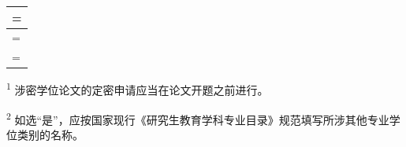 \documentclass[UTF8,fontset=fandol,zihao=5]{ctexart}
\newcommand{\ThesisTitle}{}
\newcommand{\TopicScope}{}
\newcommand{\ClassificationNumber}{}
\newcommand{\ProposalMeetingDate}{\hspace{1em}年\hspace{1em}月\hspace{1em}日}
\newcommand{\CrossDisciplineName}{}
\newcommand{\DomesticReferenceCount}{}
\newcommand{\ForeignReferenceCount}{}
\newcommand{\PublicMark}{}
\newcommand{\SecretMark}{}
\newcommand{\ConfidentialMark}{}
\newcommand{\CrossYes}{}
\newcommand{\CrossNo}{}
\newcommand{\ExpertYes}{}
\newcommand{\ExpertNo}{}
\newcommand{\KeyReferences}{}
\newcommand{\tick}{\ensuremath{\checkmark}}
\newcommand{\option}[1]{（\makebox[1em][c]{#1}）}
\newcommand{\field}[2][28mm]{\underline{\makebox[#1][c]{#2}}}
\newlength{\FormInnerWidth}
\newcommand{\FormCell}[2]{%
  \begingroup
  \setbox0=\vbox{%
    \hsize=\linewidth
    \fontsize{10.5bp}{14bp}\selectfont
    \setlength{\parindent}{0pt}\setlength{\parskip}{0pt}%
    \vspace{1.5mm}#2\par\vspace{1.5mm}}%
  \dimen0=#1\relax
  \ifdim\dimexpr\ht0+\dp0\relax<\dimen0
    \setbox0=\vbox to \dimen0{\unvbox0\vfil}%
  \fi
  \leavevmode\box0
  \endgroup}
\newenvironment{FormTable}
  {\par\noindent\begin{tabular}{|p{\FormInnerWidth}|}\hline}
  {\end{tabular}\par}
\begin{document}
\begin{FormTable}
  \FormCell{51mm}{%
    论文题目：\field[117mm]{\ThesisTitle}\par
    或选题范围：\field[113mm]{\TopicScope}\par
    论文密级请在（\quad）中打“\tick”：公开\option{\PublicMark}\quad
    秘密\option{\SecretMark}\quad 机密\option{\ConfidentialMark}\textsuperscript{1}\par
    定密申请表编号：\field[43mm]{\ClassificationNumber}
    {\fontsize{9bp}{12bp}\selectfont （对于密级为秘密或机密的学位论文）}\par
    选题报告会日期：\ProposalMeetingDate\par
    论文选题是否涉及跨专业学位类别：是\option{\CrossYes}\textsuperscript{2}
    \field[31mm]{\CrossDisciplineName}\quad 否\option{\CrossNo}\par
    {\fontsize{9.5bp}{13bp}\selectfont
    若涉及，选题报告会是否已聘请所涉其他专业学位类别的专家参加：
    是\option{\ExpertYes}\quad 否\option{\ExpertNo}\par}
  }\\\hline
  \FormCell{56mm}{%
    选题报告要求：
    \begin{enumerate}
      \item 选题报告的字数一般不少于五千字；
      \item 选题报告的内容应包括：选题意义、该领域国内外研究动态（文献综述）、本课题研究的目的、预期成果、研究方案、研究方法及其论证、关键难点拟采取的解决措施、论文工作总体日程安排，预计答辩时间等；
      \item 要求查阅一定数量的中、外文献资料。文献综述部分不是将文献内容进行简单的堆砌，而应通过阅读、消化、提炼，对已有的研究成果和动态进行全面的综述；
      \item 选题报告的考核由两部分组成：书面报告和口头报告，分别评分后给出一个总成绩；
      \item 选题报告和研究工作应具有正确的政治立场，符合学术规范；
      \item 填好“研究生选题报告及论文工作计划”表格后，连同书面报告一起交院系研究生管理部门备案。
    \end{enumerate}
  }\\\hline
  \FormCell{78mm}{%
    阅读国内外文献情况：\par
    \hspace{1em}国内文献约\field[22mm]{\DomesticReferenceCount}篇，
    国外文献约\field[26mm]{\ForeignReferenceCount}篇。\par
    主要文献：\par
    \KeyReferences
  }\\\hline
\end{FormTable}
\vspace{2mm}
{\fontsize{8bp}{10.5bp}\selectfont
\textsuperscript{1} 涉密学位论文的定密申请应当在论文开题之前进行。\par
\textsuperscript{2} 如选“是”，应按国家现行《研究生教育学科专业目录》规范填写所涉其他专业学位类别的名称。\par}
\clearpage
\end{document}
